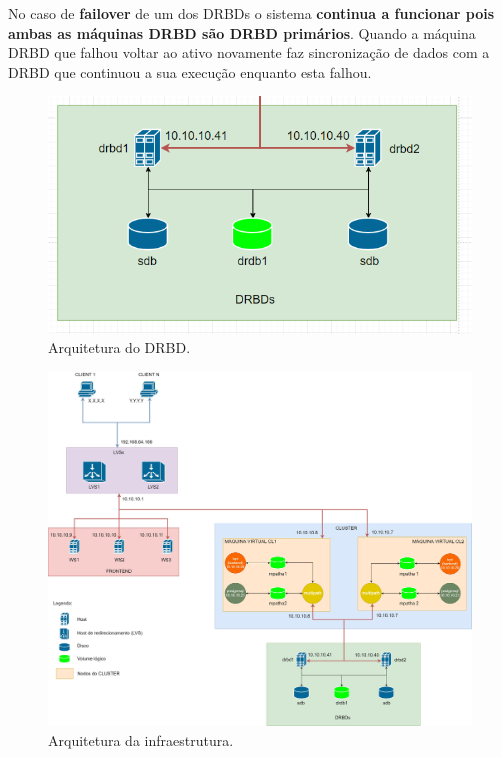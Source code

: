 \hspace{5mm} No caso de \textbf{failover} de um dos DRBDs o sistema \textbf{continua a funcionar pois ambas as máquinas DRBD são DRBD primários}. Quando a máquina DRBD que falhou voltar ao ativo novamente faz sincronização de dados com a DRBD que continuou a sua execução enquanto esta falhou.

\begin{figure}[H]
	\centering
	\includegraphics[scale=0.7]{imagens/drbd.PNG}
	\caption{Arquitetura do DRBD.}
	\label{img:pag}
\end{figure}

\begin{figure}[H]
	\centering
	\includegraphics[scale=0.14]{imagens/arquitetura.jpg}
	\caption{Arquitetura da infraestrutura.}
	\label{img:pag}
\end{figure}

